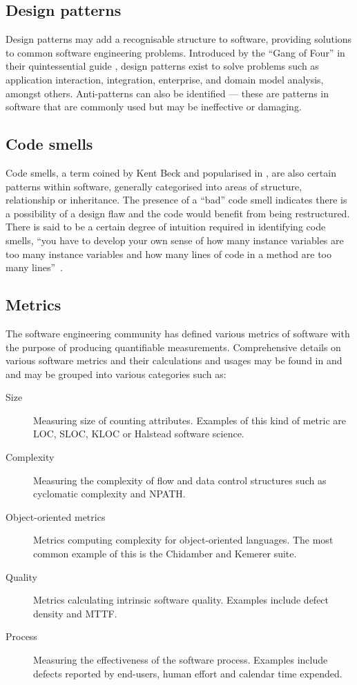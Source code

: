 \subsection{Design patterns}

Design patterns may add a recognisable structure to software, providing solutions to common software engineering problems. Introduced by the ``Gang of Four'' in their quintessential guide \citep{gamma94}, design patterns exist to solve problems such as application interaction, integration, enterprise, and domain model analysis, amongst others. Anti-patterns can also be identified --- these are patterns in software that are commonly used but may be ineffective or damaging.

\subsection{Code smells} \label{sect:codesmells}

Code smells, a term coined by Kent Beck and popularised in \cite{fowler99}, are also certain patterns within software, generally categorised into areas of structure, relationship or inheritance. The presence of a ``bad'' code smell indicates there is a possibility of a design flaw and the code would benefit from being restructured. There is said to be a certain degree of intuition required in identifying code smells, ``you have to develop your own sense of how many instance variables are too many instance variables and how many lines of code in a method are too many lines''~\citep[pg.~75]{fowler99}. 

\subsection{Metrics}

The software engineering community has defined various metrics of software with the purpose of producing quantifiable measurements.  Comprehensive details on various software metrics and their calculations and usages may be found in \citet{fenton98} and \citet{hendersonsellers95} and may be grouped into various categories such as:

\begin{description}
	\item[Size] Measuring size of counting attributes. Examples of this kind of metric are LOC, SLOC, KLOC or Halstead software science.
	\item[Complexity] Measuring the complexity of flow and data control structures such as cyclomatic complexity and NPATH.
	\item[Object-oriented metrics] Metrics computing complexity for object-oriented languages. The most common example of this is the Chidamber and Kemerer suite.
	\item[Quality] Metrics calculating intrinsic software quality. Examples include defect density and MTTF.
	\item[Process] Measuring the effectiveness of the software process. Examples include defects reported by end-users, human effort and calendar time expended.
\end{description}


